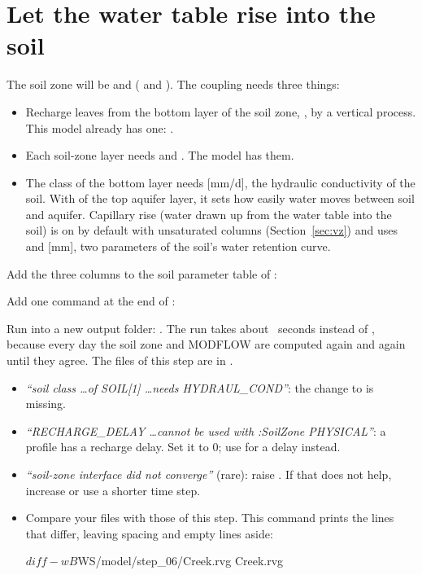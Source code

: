 \section{Let the water table rise into the soil}

The soil zone will be  and  ( and ). The coupling needs three things:
\begin{itemize}
\item Recharge leaves from the bottom layer of the soil zone, , by a vertical process. This model already
  has one: .
\item Each soil-zone layer needs  and . The model has them.
\item The class of the bottom layer needs  [mm/d], the hydraulic conductivity of the soil. With
   of the top aquifer layer, it sets how easily water moves between soil and aquifer. Capillary rise (water
  drawn up from the water table into the soil) is on by default with unsaturated columns (Section~\ref{sec:vz}) and uses
   and  [mm], two parameters of the soil's water retention curve.
\end{itemize}
Add the three columns to the soil parameter table of :

Add one command at the end of :

\label{st:physrun}
Run into a new output folder:
\see {}. The run takes about ~seconds instead of
, because every day the soil zone and MODFLOW are computed again and again until they agree. The files
of this step are in .
\begin{trouble}
\begin{itemize}
\item \emph{``soil class \dots of SOIL[1] \dots needs HYDRAUL\_COND''}: the change to  is missing.
\item \emph{``RECHARGE\_DELAY \dots cannot be used with :SoilZone PHYSICAL''}: a profile has a recharge delay. Set it to 0;
  use  for a delay instead.
\item \emph{``soil-zone interface did not converge''} (rare): raise . If that does not
  help, increase  or use a shorter time step.
\item Compare your files with those of this step. This command prints the lines that differ, leaving spacing and
  empty lines aside:
\begin{shell}
$ diff -wB $WS/model/step_06/Creek.rvg Creek.rvg
\end{shell}
\end{itemize}
\end{trouble}

